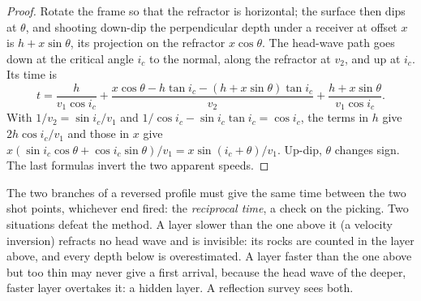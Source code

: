 \begin{proof}
Rotate the frame so that the refractor is horizontal; the surface then dips at
$\theta$, and shooting down-dip the perpendicular depth under a receiver at
offset $x$ is $h + x\sin\theta$, its projection on the refractor
$x\cos\theta$. The head-wave path goes down at the critical angle $i_c$ to the
normal, along the refractor at $v_2$, and up at $i_c$. Its time is
\[
  t = \frac{h}{v_1\cos i_c} + \frac{x\cos\theta - h\tan i_c - (h + x\sin\theta)\tan i_c}{v_2}
  + \frac{h + x\sin\theta}{v_1\cos i_c}.
\]
With $1/v_2 = \sin i_c/v_1$ and $1/\cos i_c - \sin i_c\tan i_c = \cos i_c$,
the terms in $h$ give $2h\cos i_c/v_1$ and those in $x$ give
$x(\sin i_c\cos\theta + \cos i_c\sin\theta)/v_1 = x\sin(i_c + \theta)/v_1$.
Up-dip, $\theta$ changes sign. The last formulas invert the two apparent
speeds.
\end{proof}

The two branches of a reversed profile must give the same time between the two
shot points, whichever end fired: the \emph{reciprocal time}, a check on the
picking. Two situations defeat the method. A layer slower than the one above it
(a velocity inversion) refracts no head wave and is invisible: its rocks are
counted in the layer above, and every depth below is overestimated. A layer
faster than the one above but too thin may never give a first arrival, because
the head wave of the deeper, faster layer overtakes it: a hidden layer. A
reflection survey sees both.

